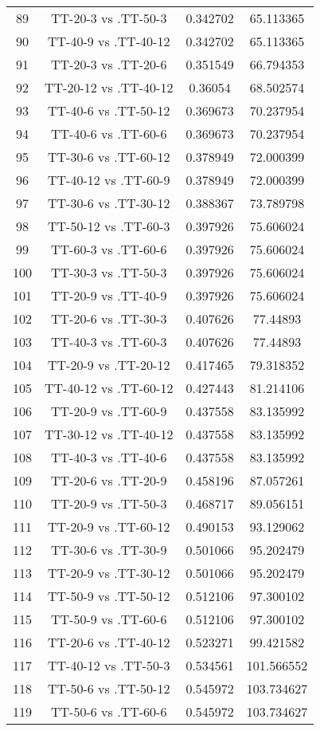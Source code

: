 \documentclass[a4paper,10pt]{article}
\begin{document}
\begin{landscape}
\begin{table}[!htp]
\begin{tabular}{cccc}
89&TT-20-3 vs .TT-50-3&0.342702&65.113365\\
90&TT-40-9 vs .TT-40-12&0.342702&65.113365\\
91&TT-20-3 vs .TT-20-6&0.351549&66.794353\\
92&TT-20-12 vs .TT-40-12&0.36054&68.502574\\
93&TT-40-6 vs .TT-50-12&0.369673&70.237954\\
94&TT-40-6 vs .TT-60-6&0.369673&70.237954\\
95&TT-30-6 vs .TT-60-12&0.378949&72.000399\\
96&TT-40-12 vs .TT-60-9&0.378949&72.000399\\
97&TT-30-6 vs .TT-30-12&0.388367&73.789798\\
98&TT-50-12 vs .TT-60-3&0.397926&75.606024\\
99&TT-60-3 vs .TT-60-6&0.397926&75.606024\\
100&TT-30-3 vs .TT-50-3&0.397926&75.606024\\
101&TT-20-9 vs .TT-40-9&0.397926&75.606024\\
102&TT-20-6 vs .TT-30-3&0.407626&77.44893\\
103&TT-40-3 vs .TT-60-3&0.407626&77.44893\\
104&TT-20-9 vs .TT-20-12&0.417465&79.318352\\
105&TT-40-12 vs .TT-60-12&0.427443&81.214106\\
106&TT-20-9 vs .TT-60-9&0.437558&83.135992\\
107&TT-30-12 vs .TT-40-12&0.437558&83.135992\\
108&TT-40-3 vs .TT-40-6&0.437558&83.135992\\
109&TT-20-6 vs .TT-20-9&0.458196&87.057261\\
110&TT-20-9 vs .TT-50-3&0.468717&89.056151\\
111&TT-20-9 vs .TT-60-12&0.490153&93.129062\\
112&TT-30-6 vs .TT-30-9&0.501066&95.202479\\
113&TT-20-9 vs .TT-30-12&0.501066&95.202479\\
114&TT-50-9 vs .TT-50-12&0.512106&97.300102\\
115&TT-50-9 vs .TT-60-6&0.512106&97.300102\\
116&TT-20-6 vs .TT-40-12&0.523271&99.421582\\
117&TT-40-12 vs .TT-50-3&0.534561&101.566552\\
118&TT-50-6 vs .TT-50-12&0.545972&103.734627\\
119&TT-50-6 vs .TT-60-6&0.545972&103.734627\\

\end{tabular}
\end{table}
\end{landscape}
\end{document}
